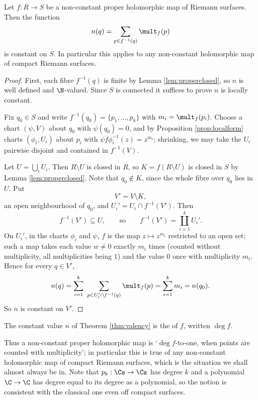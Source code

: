 \begin{theorem}\label{thm:valency}
	Let $f : R \to S$ be a non-constant proper holomorphic map of Riemann surfaces. Then
	the function
	$$
	n(q) = \sum_{p \in f^{-1}(q)} \mult_f(p)
	$$
	is constant on $S$. In particular this applies to any non-constant holomorphic map of
	compact Riemann surfaces.
\end{theorem}

\begin{proof}
	First, each fibre $f^{-1}(q)$ is finite by Lemma \ref{lem:properclosed}, so $n$ is well
	defined and $\N$-valued. Since $S$ is connected it suffices to prove $n$ is locally
	constant.

	Fix $q_0 \in S$ and write $f^{-1}(q_0) = \{p_1, \dots, p_k\}$ with
	$m_i = \mult_f(p_i)$. Choose a chart $(\psi, V)$ about $q_0$ with $\psi(q_0) = 0$, and
	by Proposition \ref{prop:localform} charts $(\phi_i, U_i)$ about $p_i$ with
	$\psi f\phi_i^{-1}(z) = z^{m_i}$; shrinking, we may take the $U_i$ pairwise disjoint and
	contained in $f^{-1}(V)$.

	Let $U = \bigcup_i U_i$. Then $R \setminus U$ is closed in $R$, so
	$K = f(R\setminus U)$ is closed in $S$ by Lemma \ref{lem:properclosed}. Note that
	$q_0 \notin K$, since the whole fibre over $q_0$ lies in $U$. Put
	$$
	V' = V \setminus K,
	$$
	an open neighbourhood of $q_0$, and $U_i' = U_i \cap f^{-1}(V')$. Then
	$$
	f^{-1}(V') \subseteq U, \qquad \text{so} \qquad f^{-1}(V') = \coprod_{i=1}^k U_i'.
	$$
	On $U_i'$, in the charts $\phi_i$ and $\psi$, $f$ is the map $z \mapsto z^{m_i}$
	restricted to an open set; such a map takes each value $w \neq 0$ exactly $m_i$ times
	(counted without multiplicity, all multiplicities being $1$) and the value $0$ once with
	multiplicity $m_i$. Hence for every $q \in V'$,
	$$
	n(q) = \sum_{i=1}^{k}\ \sum_{p\in U_i' \cap f^{-1}(q)}\mult_f(p) = \sum_{i=1}^k m_i = n(q_0).
	$$
	So $n$ is constant on $V'$.
\end{proof}

\begin{definition}[Degree]
	The constant value $n$ of Theorem \ref{thm:valency} is the  of $f$,
	written $\deg f$.
\end{definition}

Thus a non-constant proper holomorphic map is `$\deg f$-to-one, when points are counted
with multiplicity'; in particular this is true of any non-constant holomorphic map of
compact Riemann surfaces, which is the situation we shall almost always be in. Note that
$p_k : \Cs\to\Cs$ has degree $k$ and a polynomial $\C\to\C$ has degree equal to its degree
as a polynomial, so the notion is consistent with the classical one even off compact
surfaces.

